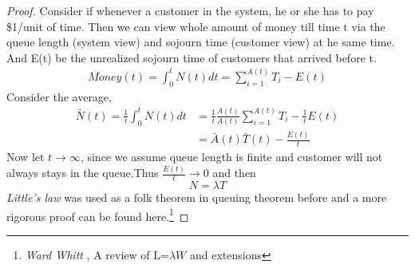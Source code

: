 \documentclass[project2.tex]{subfiles}
\begin{document}
\begin{proof}
Consider if whenever a customer in the system, he or she has to pay \$1/unit of time. Then we can view whole amount of money till time t via the queue length (system view) and sojourn time (customer view) at he same time. And E(t) be the unrealized sojourn time of customers that arrived before t. 
\begin{align*}
Money(t)=\int_0^tN(t)dt=\sum_{i=1}^{A(t)}T_i-E(t)
\end{align*}
Consider the average,
\begin{align*}
\bar{N}(t)=\frac{1}{t}\int_0^tN(t)dt&=\frac{1}{t}\frac{A(t)}{A(t)}\sum_{i=1}^{A(t)}T_i-\frac{1}{t}E(t)\\
&=\bar{A}(t)\bar{T}(t)-\frac{E(t)}{t}
\end{align*} 
Now let $t\rightarrow\infty$, since we assume queue length is finite and customer will not always stays in the queue.Thus $\frac{E(t)}{t}\rightarrow 0$ and then $$N=\lambda T$$
{\it Little's law} was used as a folk theorem in queuing theorem before and a more rigorous proof can be found here.\footnote{\emph{Ward Whitt }, A review of L=$\lambda W$ and extensions } 
\end{proof}
\end{document}
